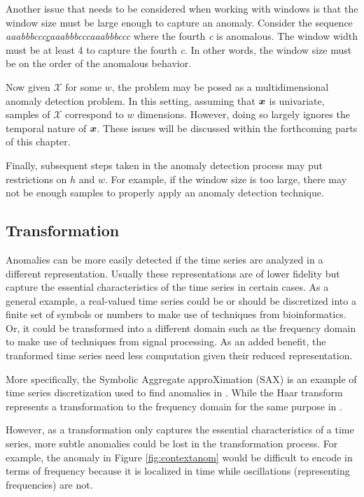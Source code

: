 \begin{sloppypar}%
Another issue that needs to be considered when working with windows is that the window size must be large enough to capture an anomaly. Consider the sequence \emph{aaabbbccc\underline{c}aaabbbcccaaabbbccc} where the fourth \emph{c} is anomalous. The window width must be at least 4 to capture the fourth \emph{c}. In other words, the window size must be on the order of the anomalous behavior.
\end{sloppypar}

Now given $\mathcal{X}$ for some $w$, the problem may be posed as a multidimensional anomaly detection problem. In this setting, assuming that $\boldsymbol{x}$ is univariate, samples of $\mathcal{X}$ correspond to $w$ dimensions. However, doing so largely ignores the temporal nature of $\boldsymbol{x}$. These issues will be discussed within the forthcoming parts of this chapter.

Finally, subsequent steps taken in the anomaly detection process may put restrictions on $h$ and $w$. For example, if the window size is too large, there may not be enough samples to properly apply an anomaly detection technique.

\subsection{Transformation}

Anomalies can be more easily detected if the time series are analyzed in a different representation. Usually these representations are of lower fidelity but capture the essential characteristics of the time series in certain cases. As a general example, a real-valued time series could be or should be discretized into a finite set of symbols or numbers to make use of techniques from bioinformatics. Or, it could be transformed into a different domain such as the frequency domain to make use of techniques from signal processing. As an added benefit, the tranformed time series need less computation given their reduced representation.

More specifically, the Symbolic Aggregate approXimation (SAX) \cite{Lin2007} is an example of time series discretization used to find anomalies in  \cite{Keogh2005}. While the Haar transform represents a transformation to the frequency domain for the same purpose in \cite{Bu2007,fu2006finding}.

However, as a transformation only captures the essential characteristics of a time series, more subtle anomalies could be lost in the transformation process. For example, the anomaly in Figure \ref{fig:contextanom} would be difficult to encode in terms of frequency because it is localized in time while oscillations (representing frequencies) are not.

